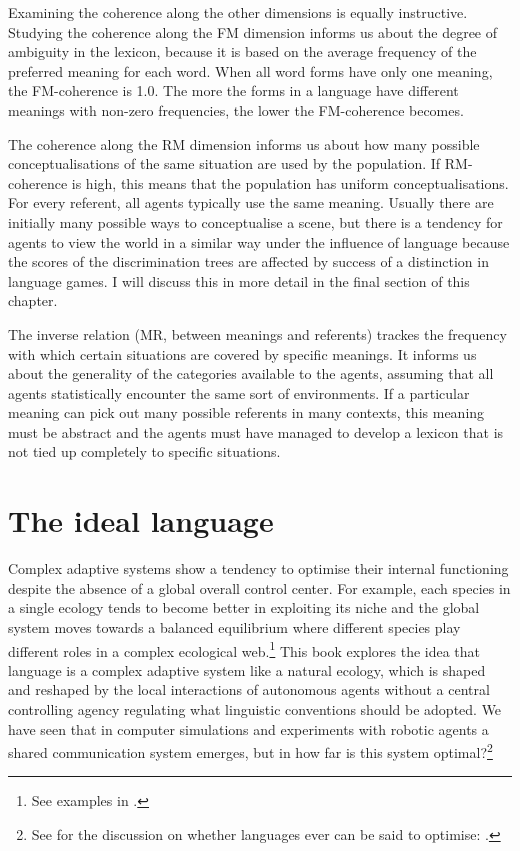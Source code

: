 Examining the coherence along the other dimensions is 
equally instructive. Studying the coherence along the FM 
dimension informs us about the degree of ambiguity in the lexicon, 
because it is based on the average frequency of
the preferred meaning for each word. 
When all word forms have only one meaning, the FM-coherence is 
1.0. The more the forms in a language have different 
meanings with non-zero frequencies, the lower the FM-coherence
becomes. 

The coherence along the RM dimension informs us 
about how many possible conceptualisations of the same
situation are used by the population. If RM-coherence is 
high, this means that the population has 
uniform conceptualisations. For every referent, 
all agents typically use the same meaning. 
Usually there are initially many possible ways to conceptualise 
a scene, but there is a tendency 
for agents to view the world in a similar way under
the influence of language because the scores of the 
discrimination trees are affected by success of a 
distinction in language games. I will discuss this 
in more detail in the final section of this chapter.

The inverse relation (MR, between meanings and referents)
trackes the frequency with 
which certain situations are covered by specific
meanings. It informs us about 
the generality of the categories available to the 
agents, assuming that all agents statistically encounter
the same sort of environments. If a particular meaning can
pick out many possible referents in many contexts, this
meaning must be abstract and the agents must have managed
to develop a lexicon that is not tied up completely 
to specific situations. 

\section{The ideal language}

Complex adaptive systems show a tendency to
optimise their internal functioning despite the absence of
a global overall control center. For example, 
each species in a single ecology tends to become 
better in exploiting its niche and the global system 
moves towards a balanced equilibrium where different
species play different roles in a complex ecological 
web.\footnote{See examples in \cite{Margulis:1991}.} This book explores the idea that language 
is a complex adaptive system like a natural ecology, 
which is shaped and 
reshaped by the local interactions of autonomous 
agents without a central controlling agency regulating
what linguistic conventions should be adopted. 
We have seen that in computer simulations and experiments
with robotic agents a shared communication system 
emerges, but in how far is this system optimal?\footnote{
See for the discussion on whether languages ever
can be said to optimise: \cite{Kirby:1999}.} 


